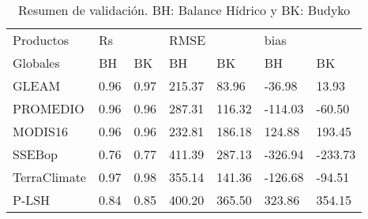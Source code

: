 \begin{table}[hbt]
\caption{Resumen de validación. BH: Balance Hídrico y BK: Budyko}
\label{tab:Table_r_rmse_bias}
\centering
\begin{tabular}{lllllll}
\hline
Productos    & \multicolumn{2}{l}{Rs} & \multicolumn{2}{l}{RMSE} & \multicolumn{2}{l}{bias} \\
Globales     & BH             & BK             & BH                   & BK                  & BH          & BK         \\  \hline
GLEAM        & 0.96           & 0.97           & 215.37               & 83.96               & -36.98      & 13.93      \\
PROMEDIO         & 0.96           & 0.96           & 287.31               & 116.32              & -114.03     & -60.50     \\
MODIS16      & 0.96           & 0.96           & 232.81               & 186.18              & 124.88      & 193.45     \\
SSEBop       & 0.76           & 0.77           & 411.39               & 287.13              & -326.94     & -233.73    \\
TerraClimate & 0.97           & 0.98           & 355.14               & 141.36              & -126.68     & -94.51     \\
P-LSH        & 0.84           & 0.85           & 400.20               & 365.50              & 323.86      & 354.15 \\ \hline    
\end{tabular}
\end{table}